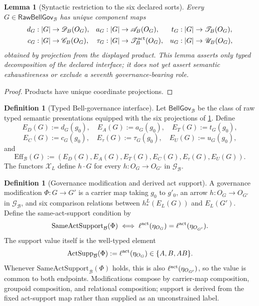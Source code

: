 \documentclass[11pt]{article}
\newtheorem{lemma}[theorem]{Lemma}
\theoremstyle{definition}
\newtheorem{definition}[theorem]{Definition}
\newcommand{\Bell}{\mathcal{B}}
\newcommand{\BellLaw}{\mathscr{G}_{\Bell}}
\newcommand{\RawBellGov}{\mathsf{RawBellGov}_{\Bell}}
\newcommand{\BellGov}{\mathsf{BellGov}_{\Bell}}
\newcommand{\GovEff}{\mathrm{Eff}_{\Bell}}
\newcommand{\ActSupp}{\mathrm{ActSupp}_{\Bell}}
\newcommand{\SameActSupp}{\mathrm{SameActSupport}_{\Bell}}
\begin{document}
\begin{lemma}[Syntactic restriction to the six declared sorts]\label{lem:syntacticrestriction}
Every $G\in\RawBellGov$ has unique component maps
\[
\begin{aligned}
d_G&:|G|\to\mathscr D_B(O_G),&a_G&:|G|\to\mathscr A_B(O_G),&t_G&:|G|\to\mathscr T_B(O_G),\\
c_G&:|G|\to\mathscr C_B(O_G),&\tau_G&:|G|\to\mathscr T_B^{\rm act}(O_G),&u_G&:|G|\to\mathscr U_B(O_G),
\end{aligned}
\]
obtained by projection from the displayed product. This lemma asserts only typed decomposition of the declared interface; it does not yet assert semantic exhaustiveness or exclude a seventh governance-bearing role.
\end{lemma}
\begin{proof}
Products have unique coordinate projections.
\end{proof}

\begin{definition}[Typed Bell-governance interface]\label{def:factoredbellgov}
Let $\BellGov$ be the class of raw typed semantic presentations equipped with the six projections of \cref{lem:syntacticrestriction}. Define
\[
E_D(G):=d_G(g_0),\quad E_A(G):=a_G(g_0),\quad E_T(G):=t_G(g_0),
\]
\[
E_C(G):=c_G(g_0),\quad E_{\tau}(G):=\tau_G(g_0),\quad E_U(G):=u_G(g_0),
\]
and
\[
\GovEff(G):=(E_D(G),E_A(G),E_T(G),E_C(G),E_{\tau}(G),E_U(G)).
\]
The functors $\mathscr X_L$ define $h\!\cdot\!G$ for every $h:O_G\to O_{G'}$ in $\BellLaw$.
\end{definition}

\begin{definition}[Governance modification and derived act support]\label{def:governancemorphism}
A governance modification $\Phi:G\to G'$ is a carrier map taking $g_0$ to $g'_0$, an arrow $h:O_G\to O_{G'}$ in $\BellLaw$, and six comparison relations between $h_*^L(E_L(G))$ and $E_L(G')$. Define the same-act-support condition by
\[
\SameActSupp(\Phi)
\iff
\ell^{\rm act}(\eta_{O_G})=\ell^{\rm act}(\eta_{O_{G'}}).
\]
The support value itself is the well-typed element
\[
\ActSupp(\Phi):=\ell^{\rm act}(\eta_{O_G})\in\{A,B,AB\}.
\]
Whenever $\SameActSupp(\Phi)$ holds, this is also $\ell^{\rm act}(\eta_{O_{G'}})$, so the value is common to both endpoints. Modifications compose by carrier-map composition, groupoid composition, and relational composition; support is derived from the fixed act-support map rather than supplied as an unconstrained label.
\end{definition}
\end{document}

